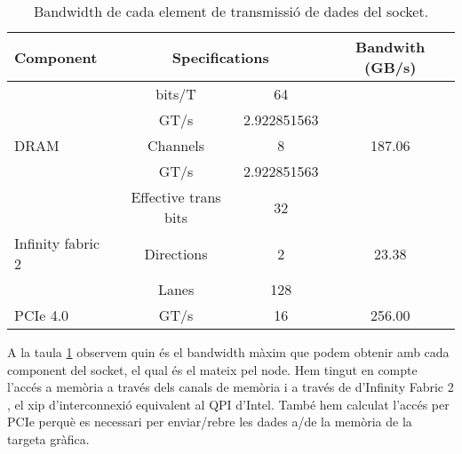 \begin{table}[h]
\begin{adjustwidth}{-1.5in}{-1.5in}
\begin{center}
\begin{tabular}{l||c|c|c}
    \hline
Component                           & \multicolumn{2}{c|}{Specifications}                                         & Bandwith (GB/s)          \\ \hline  \hline 
                                    & \cellcolor[HTML]{EFEFEF}bits/T               & \cellcolor[HTML]{EFEFEF}64  &                          \\
                                    & GT/s                                         & 2.922851563                 &                          \\
    \multirow{-3}{*}{DRAM}              & \cellcolor[HTML]{EFEFEF}Channels             & \cellcolor[HTML]{EFEFEF}8   & \multirow{-3}{*}{187.06} \\ \hline
                                    & GT/s                                         & 2.922851563                 &                          \\
                                    & \cellcolor[HTML]{EFEFEF}Effective trans bits & \cellcolor[HTML]{EFEFEF}32  &                          \\
    \multirow{-3}{*}{Infinity fabric 2} & Directions                                   & 2                           & \multirow{-3}{*}{23.38}  \\ \hline
                                    & \cellcolor[HTML]{EFEFEF}Lanes                & \cellcolor[HTML]{EFEFEF}128 &                          \\
\multirow{-2}{*}{PCIe 4.0}          & GT/s                                         & 16                          & \multirow{-2}{*}{256.00} \\ \hline
\end{tabular}
    \caption{Bandwidth de cada element de transmissió de dades del socket.}
    \label{tab:peak_bw}
\end{center}
\end{adjustwidth}
\end{table}

A la taula \ref{tab:peak_bw} observem quin és el bandwidth màxim que podem obtenir amb cada component del socket, el qual és el mateix pel node. Hem tingut en compte l'accés a memòria a través dels canals de memòria i a través de d'Infinity Fabric 2 \cite{amd_if2}, el xip d'interconnexió equivalent al QPI d'Intel. També hem calculat l'accés per PCIe perquè es necessari per enviar/rebre les dades a/de la memòria de la targeta gràfica.

